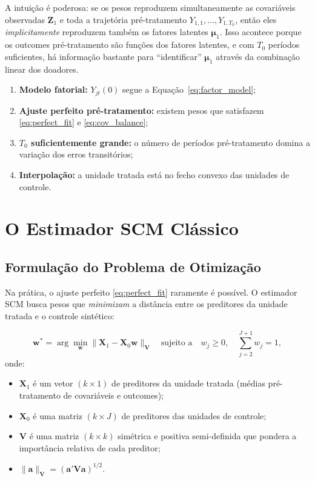 \documentclass[12pt, a4paper, openany]{book}
\begin{document}
A intuição é poderosa: se os pesos reproduzem simultaneamente as covariáveis observadas $\mathbf{Z}_1$ e toda a trajetória pré-tratamento $Y_{1,1}, \ldots, Y_{1,T_0}$, então eles \textit{implicitamente} reproduzem também os fatores latentes $\boldsymbol{\mu}_1$. Isso acontece porque os outcomes pré-tratamento são funções dos fatores latentes, e com $T_0$ períodos suficientes, há informação bastante para ``identificar'' $\boldsymbol{\mu}_1$ através da combinação linear dos doadores.

\begin{hipotesebox}
\begin{enumerate}
  \item \textbf{Modelo fatorial:} $Y_{jt}(0)$ segue a Equação~\eqref{eq:factor_model};
  \item \textbf{Ajuste perfeito pré-tratamento:} existem pesos que satisfazem \eqref{eq:perfect_fit} e \eqref{eq:cov_balance};
  \item \textbf{$T_0$ suficientemente grande:} o número de períodos pré-tratamento domina a variação dos erros transitórios;
  \item \textbf{Interpolação:} a unidade tratada está no fecho convexo das unidades de controle.
\end{enumerate}
\end{hipotesebox}


\section{O Estimador SCM Clássico}

\subsection{Formulação do Problema de Otimização}

Na prática, o ajuste perfeito \eqref{eq:perfect_fit} raramente é possível. O estimador SCM busca pesos que \textit{minimizam} a distância entre os preditores da unidade tratada e o controle sintético:

\begin{equation}
  \mathbf{w}^* = \arg\min_{\mathbf{w}} \|\mathbf{X}_1 - \mathbf{X}_0 \mathbf{w}\|_{\mathbf{V}} \quad \text{sujeito a} \quad w_j \geq 0, \quad \sum_{j=2}^{J+1} w_j = 1,
  \label{eq:scm_opt}
\end{equation}
onde:
\begin{itemize}[leftmargin=1.5cm]
  \item $\mathbf{X}_1$ é um vetor $(k \times 1)$ de preditores da unidade tratada (médias pré-tratamento de covariáveis e outcomes);
  \item $\mathbf{X}_0$ é uma matriz $(k \times J)$ de preditores das unidades de controle;
  \item $\mathbf{V}$ é uma matriz $(k \times k)$ simétrica e positiva semi-definida que pondera a importância relativa de cada preditor;
  \item $\|\mathbf{a}\|_{\mathbf{V}} = (\mathbf{a}'\mathbf{V}\mathbf{a})^{1/2}$.
\end{itemize}
\end{document}
